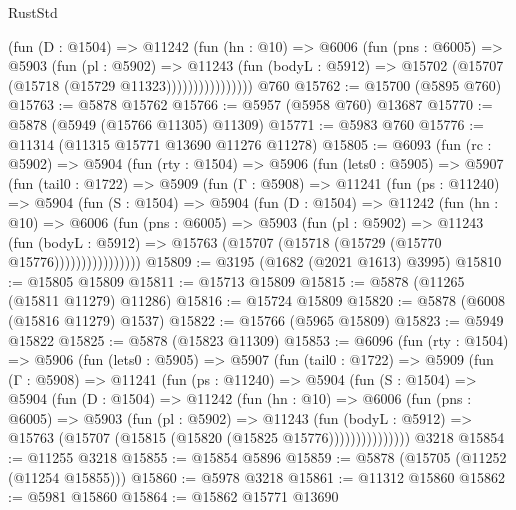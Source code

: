 \begin{lexlean}{RustStd}
\begin{coremodule}
                    (fun (D : @1504) =>
                    @11242
                      (fun (hn : @10) =>
                      @6006
                        (fun (pns : @6005) =>
                        @5903
                          (fun (pl : @5902) =>
                          @11243
                            (fun (bodyL : @5912) =>
                            @15702 (@15707 (@15718 (@15729 @11323))))))))))))))))
    @760
@15762 := @15700 (@5895 @760)
@15763 := @5878 @15762
@15766 := @5957 (@5958 @760) @13687
@15770 := @5878 (@5949 (@15766 @11305) @11309)
@15771 := @5983 @760
@15776 := @11314 (@11315 @15771 @13690 @11276 @11278)
@15805 := @6093
    (fun (rc : @5902) =>
    @5904
      (fun (rty : @1504) =>
      @5906
        (fun (lets0 : @5905) =>
        @5907
          (fun (tail0 : @1722) =>
          @5909
            (fun (Γ : @5908) =>
            @11241
              (fun (ps : @11240) =>
              @5904
                (fun (S : @1504) =>
                @5904
                  (fun (D : @1504) =>
                  @11242
                    (fun (hn : @10) =>
                    @6006
                      (fun (pns : @6005) =>
                      @5903
                        (fun (pl : @5902) =>
                        @11243
                          (fun (bodyL : @5912) =>
                          @15763 (@15707 (@15718 (@15729 (@15770 @15776))))))))))))))))
@15809 := @3195 (@1682 (@2021 @1613) @3995)
@15810 := @15805 @15809
@15811 := @15713 @15809
@15815 := @5878 (@11265 (@15811 @11279) @11286)
@15816 := @15724 @15809
@15820 := @5878 (@6008 (@15816 @11279) @1537)
@15822 := @15766 (@5965 @15809)
@15823 := @5949 @15822
@15825 := @5878 (@15823 @11309)
@15853 := @6096
    (fun (rty : @1504) =>
    @5906
      (fun (lets0 : @5905) =>
      @5907
        (fun (tail0 : @1722) =>
        @5909
          (fun (Γ : @5908) =>
          @11241
            (fun (ps : @11240) =>
            @5904
              (fun (S : @1504) =>
              @5904
                (fun (D : @1504) =>
                @11242
                  (fun (hn : @10) =>
                  @6006
                    (fun (pns : @6005) =>
                    @5903
                      (fun (pl : @5902) =>
                      @11243
                        (fun (bodyL : @5912) =>
                        @15763 (@15707 (@15815 (@15820 (@15825 @15776)))))))))))))))
    @3218
@15854 := @11255 @3218
@15855 := @15854 @5896
@15859 := @5878 (@15705 (@11252 (@11254 @15855)))
@15860 := @5978 @3218
@15861 := @11312 @15860
@15862 := @5981 @15860
@15864 := @15862 @15771 @13690

\end{coremodule}
\end{lexlean}
